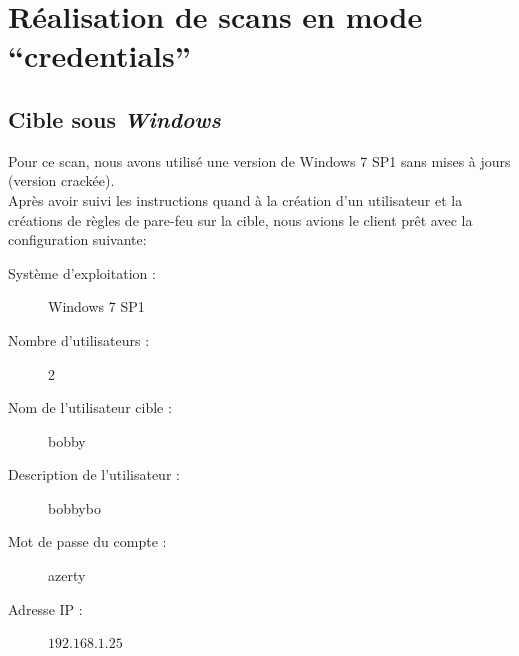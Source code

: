 \section{Réalisation de scans en mode \enquote{credentials}}
\subsection{Cible sous \textit{Windows}}
Pour ce scan, nous avons utilisé une version de Windows 7 SP1 sans mises à jours (version crackée).\\
Après avoir suivi les instructions quand à la création d'un utilisateur et la créations de règles de pare-feu sur la cible, nous avions le client prêt avec la configuration suivante:
\begin{description}
 \item[Système d'exploitation :] Windows 7 SP1
 \item[Nombre d'utilisateurs :] 2
 \item[Nom de l'utilisateur cible :] bobby
 \item[Description de l'utilisateur :] bobbybo
 \item[Mot de passe du compte :] azerty
 \item[Adresse IP :] $192.168.1.25$
\end{description}

